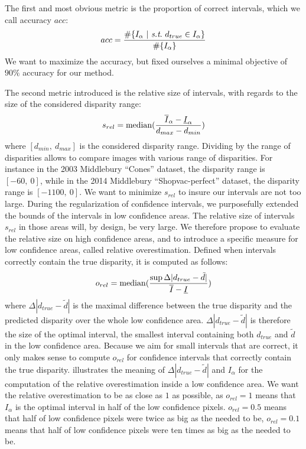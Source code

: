 The first and most obvious metric is the proportion of correct intervals, which we call accuracy $acc$:
\begin{align}
    acc = \dfrac{\#\{I_\alpha ~|~ \st ~d_{true}\in I_\alpha\}}{\#\{I_\alpha\}}
\end{align}
We want to maximize the accuracy, but fixed ourselves a minimal objective of $90\%$ accuracy for our method.

The second metric introduced is the relative size of intervals, with regards to the size of the considered disparity range:
\begin{align}
    s_{rel}=\operatorname*{median}(\dfrac{\overline{I}_\alpha-\underline{I}_\alpha}{d_{max}-d_{min}})
\end{align}
where $[d_{min}, ~d_{max}]$ is the considered disparity range. Dividing by the range of disparities allows to compare images with various range of disparities. For instance in the 2003 Middlebury ``Cones'' dataset, the disparity range is $[-60, ~0]$, while in the 2014 Middlebury ``Shopvac-perfect'' dataset, the disparity range is $[-1100, ~0]$. We want to minimize $s_{rel}$ to insure our intervals are not too large. During the regularization of confidence intervals, we purposefully extended the bounds of the intervals in low confidence areas. The relative size of intervals $s_{rel}$ in those areas will, by design, be very large. We therefore propose to evaluate the relative size on high confidence areas, and to introduce a specific measure for low confidence areas, called relative overestimation. Defined when intervals correctly contain the true disparity, it is computed as follows:
\begin{align}
    o_{rel}=\operatorname*{median}(\dfrac{\sup\Delta|d_{true}-\tilde{d}|}{\overline{I}-\underline{I}})\label{eq:relative_overestimation}
\end{align}
where $\Delta|d_{true}-\tilde{d}|$ is the maximal difference between the true disparity and the predicted disparity over the whole low confidence area. $\Delta|d_{true}-\tilde{d}|$ is therefore the size of the optimal interval, \ie the smallest interval containing both $d_{true}$ and $\tilde{d}$ in the low confidence area. Because we aim for small intervals that are correct, it only makes sense to compute $o_{rel}$ for confidence intervals that correctly contain the true disparity.  illustrates the meaning of $\Delta|d_{true}-\tilde{d}|$ and $I_\alpha$ for the computation of the relative overestimation inside a low confidence area. We want the relative overestimation to be as close as $1$ as possible, as $o_{rel}=1$ means that $I_\alpha$ is the optimal interval in half of the low confidence pixels. $o_{rel}=0.5$ means that half of low confidence pixels were twice as big as the needed to be, $o_{rel}=0.1$ means that half of low confidence pixels were ten times as big as the needed to be\etc.

